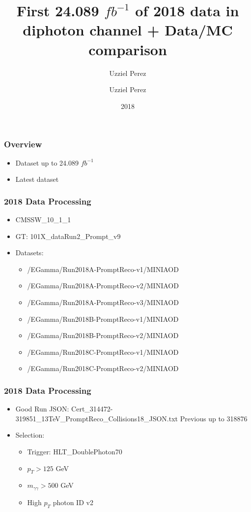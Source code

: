 \documentclass{beamer}
\author[UP]{Uzziel Perez}
\title{First \cmmnt{36.381/fb} 24.089 $fb^{-1}$ of 2018 data in diphoton channel + Data/MC comparison}
\author{Uzziel Perez}
\institute{University of Alabama}
\date{2018}
\begin{document}
\frame{\titlepage}

\begin{frame}
\frametitle{Overview}
\begin{itemize}
  \item Dataset up to 24.089 $fb^{-1}$
  \item Latest dataset
\end{itemize}
\end{frame}


\begin{frame}
\frametitle{2018 Data Processing}
\begin{itemize}
  \item CMSSW\_10\_1\_1
  \item GT: 101X\_dataRun2\_Prompt\_v9
  \item Datasets:
  \begin{itemize}
    \item /EGamma/Run2018A-PromptReco-v1/MINIAOD
    \item /EGamma/Run2018A-PromptReco-v2/MINIAOD
    \item /EGamma/Run2018A-PromptReco-v3/MINIAOD
    \item /EGamma/Run2018B-PromptReco-v1/MINIAOD
    \item /EGamma/Run2018B-PromptReco-v2/MINIAOD
    \item /EGamma/Run2018C-PromptReco-v1/MINIAOD
    \item /EGamma/Run2018C-PromptReco-v2/MINIAOD
  \end{itemize}
\end{itemize}
\end{frame}

\begin{frame}
\frametitle{2018 Data Processing}
\begin{itemize}
  \item Good Run JSON: {\fontsize{90}{60} Cert\_314472-319851\_13TeV\_PromptReco\_Collisions18\_JSON.txt}
  {\small Previous up to 318876}
  \item Selection:
  \begin{itemize}
    \item Trigger: HLT\_DoublePhoton70
    \item $p_{T} > 125$ GeV
    \item $m_{\gamma\gamma} > 500$ GeV
    \item High $p_{T}$ photon ID v2
  \end{itemize}
\end{itemize}
\end{frame}
\end{document}
